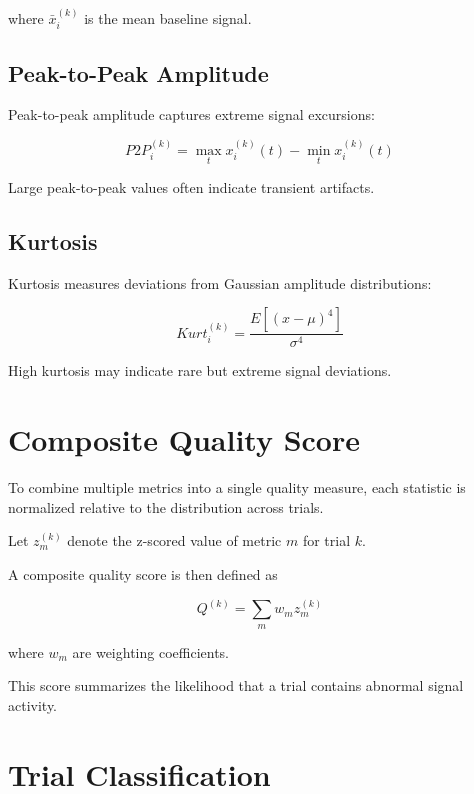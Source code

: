 \documentclass[11pt]{report}
\begin{document}
where $\bar{x}_i^{(k)}$ is the mean baseline signal.

\subsection{Peak-to-Peak Amplitude}

Peak-to-peak amplitude captures extreme signal excursions:

\begin{equation}
P2P_i^{(k)} =
\max_t x_i^{(k)}(t) -
\min_t x_i^{(k)}(t)
\end{equation}

Large peak-to-peak values often indicate transient artifacts.

\subsection{Kurtosis}

Kurtosis measures deviations from Gaussian amplitude distributions:

\begin{equation}
Kurt_i^{(k)} =
\frac{E[(x - \mu)^4]}{\sigma^4}
\end{equation}

High kurtosis may indicate rare but extreme signal deviations.

\section{Composite Quality Score}

To combine multiple metrics into a single quality measure,
each statistic is normalized relative to the distribution
across trials.

Let $z_m^{(k)}$ denote the z-scored value of metric $m$ for trial $k$.

A composite quality score is then defined as

\begin{equation}
Q^{(k)} =
\sum_m w_m z_m^{(k)}
\end{equation}

where $w_m$ are weighting coefficients.

This score summarizes the likelihood that a trial contains
abnormal signal activity.

\section{Trial Classification}
\end{document}
